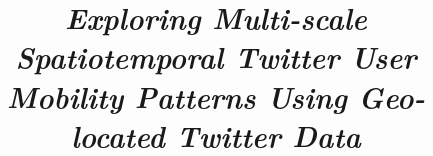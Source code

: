 \documentclass[a4paper, 11pt]{article}
\date{}
\begin{document}
%
\title{\itshape Exploring Multi-scale Spatiotemporal Twitter User Mobility Patterns Using Geo-located Twitter Data}
	\author{}
%	


\maketitle

%
\renewcommand{\baselinestretch}{1.5}

\onehalfspacing
\end{document}
